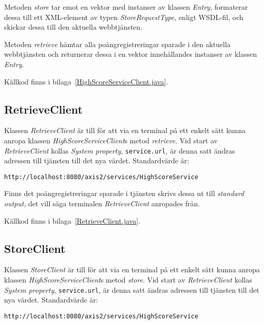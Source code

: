 \documentclass[a4paper, 12pt]{article}
\begin{document}
Metoden \textit{store} tar emot en vektor med instanser av klassen
\textit{Entry}, formaterar dessa till ett XML-element av typen
\textit{StoreRequestType}, enligt WSDL-fil, och skickar dessa till den
aktuella webbtjänsten.

Metoden \textit{retrieve} hämtar alla poängregistreringar sparade i
den aktuella webbtjänsten och returnerar dessa i en vektor
innehållandes instanser av klassen \textit{Entry}.

Källkod finns i bilaga~\ref{HighScoreServiceClient.java}.

\subsection{RetrieveClient}
Klassen \textit{RetrieveClient} är till för att via en terminal på ett
enkelt sätt kunna anropa klassen \textit{HighScoreServiceClient}s
metod \textit{retrieve}. Vid start av \textit{RetrieveClient} kollas
\textit{System property}, \verb!service.url!, är denna satt ändras
adressen till tjänsten till det nya värdet. Standardvärde är:

\begin{footnotesize}
\begin{verbatim}
http://localhost:8080/axis2/services/HighScoreService
\end{verbatim}
\end{footnotesize}

Finns det poängregistreringar sparade i tjänsten skrivs dessa ut till
\textit{standard output}, det vill säga terminalen
\textit{RetrieveClient} anropades från.

Källkod finns i bilaga~\ref{RetrieveClient.java}.

\subsection{StoreClient}
Klassen \textit{StoreClient} är till för att via en terminal på ett
enkelt sätt kunna anropa klassen \textit{HighScoreServiceClient}s
metod \textit{store}. Vid start av \textit{RetrieveClient} kollas
\textit{System property}, \verb!service.url!, är denna satt ändras
adressen till tjänsten till det nya värdet. Standardvärde är:

\begin{footnotesize}
\begin{verbatim}
http://localhost:8080/axis2/services/HighScoreService
\end{verbatim}
\end{footnotesize}
\end{document}
